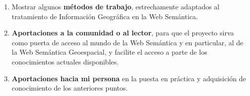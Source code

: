 \begin{enumerate}
	\item Mostrar algunos \textbf{métodos de trabajo}, estrechamente adaptados al tratamiento de Información Geográfica en la Web Semántica.
	
	\item \textbf{Aportaciones a la comunidad o al lector}, para que el proyecto sirva como puerta de acceso al mundo de la Web Semántica y en particular, al de la Web Semántica Geoespacial, y facilite el acceso a parte de los conocimientos actuales disponibles.
	
	\item \textbf{Aportaciones hacia mi persona} en la puesta en práctica y adquisición de conocimiento de los anteriores puntos.

	
	
	
	
	
	
	
	

\end{enumerate}


